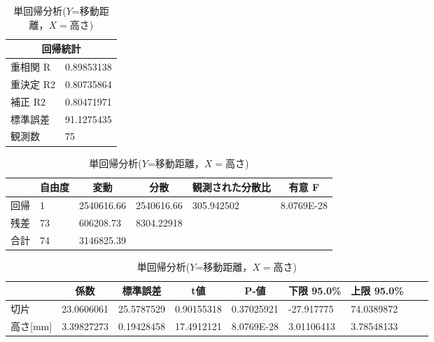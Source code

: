 \documentclass[titlepage,a4paper]{jsarticle}
\begin{document}
\begin{table}[H]
  \centering
  \caption{単回帰分析($Y$=移動距離，$X=$高さ)}
  \label{単回帰分析}
  \begin{minipage}[c]{1\hsize}
    \centering
    \label{単回帰統計}
    \begin{tabular}{l|l}
      \multicolumn{2}{c}{回帰統計} \\\hline\hline
      重相関 R  & 0.89853138      \\
      重決定 R2 & 0.80735864      \\
      補正 R2  & 0.80471971      \\
      標準誤差   & 91.1275435      \\
      観測数    & 75              \\\hline
    \end{tabular}
  \end{minipage}

  \begin{minipage}[c]{1\hsize}
    \centering
    \label{sub分散1}
    \begin{tabular}{l|lllll}
      \multicolumn{1}{c|}{} & \multicolumn{1}{c}{自由度} & \multicolumn{1}{c}{変動} & \multicolumn{1}{c}{分散} & \multicolumn{1}{c}{観測された分散比} & \multicolumn{1}{c}{有意 F} \\\hline\hline
      回帰                    & 1                       & 2540616.66             & 2540616.66             & 305.942502                   & 8.0769E-28               \\
      残差                    & 73                      & 606208.73              & 8304.22918             &                              &                          \\
      合計                    & 74                      & 3146825.39             &                        &                              &                          \\\hline
    \end{tabular}
  \end{minipage}

  \begin{minipage}[c]{1\hsize}
    \centering
    \label{sub分散2}
    \begin{tabular}{l|llllllll}
      \multicolumn{1}{c|}{} & \multicolumn{1}{c}{係数} & \multicolumn{1}{c}{標準誤差} & \multicolumn{1}{c}{t値} & \multicolumn{1}{c}{P-値} & \multicolumn{1}{c}{下限 95.0\%} & \multicolumn{1}{c}{上限 95.0\%} \\\hline\hline
      切片                    & 23.0606061             & 25.5787529               & 0.90155318             & 0.37025921              & -27.917775                    & 74.0389872                    \\
      高さ{[}mm{]}            & 3.39827273             & 0.19428458               & 17.4912121             & 8.0769E-28              & 3.01106413                    & 3.78548133                    \\\hline
    \end{tabular}
  \end{minipage}
\end{table}
\end{document}
